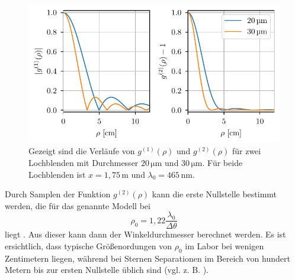 \begin{figure}[h]
    \centering
    \includegraphics{images/Theorie/g1_g2_rho.pdf}
    \caption{Gezeigt sind die Verläufe von $g^{(1)}(\rho)$ und $g^{(2)}(\rho)$ für zwei Lochblenden mit Durchmesser $20\,\mathrm{\mu m}$ und $30\,\mathrm{\mu m}$. Für beide Lochblenden ist $x=1{,}75\,\mathrm{m}$ und $\lambda_0=465\,\mathrm{nm}$.}
    \label{fig:g1(rho),g2(rho) für versch Lochblenden}
\end{figure}
Durch Samplen der Funktion $g^{(2)}(\rho)$ kann die erste Nullstelle bestimmt werden, die für das genannte Modell bei 
\begin{equation}
    \rho_0=1{,}22\frac{\lambda_0}{\Delta\theta} 
    \label{eq:erste nulstelle von g2(rho) für lochblende}
\end{equation}
liegt \cite[Kap. 4.1]{brownIntensityInterferometerIts1974}. 
Aus dieser kann dann der Winkeldurchmesser berechnet werden. 
Es ist ersichtlich, dass typische Größenordungen von $\rho_0$ im Labor bei wenigen Zentimetern liegen, während bei Sternen Separationen im Bereich von hundert Metern bis zur ersten Nullstelle üblich sind (vgl. z. B. \cite[Abb. 10.2]{brownIntensityInterferometerIts1974}). \\


